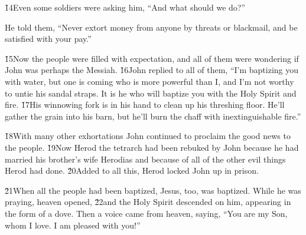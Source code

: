 \v{14}Even some soldiers were asking him, ``And what should we do?''

He told them, ``Never extort money from anyone by threats or blackmail, and be satisfied with your pay.''

\v{15}Now the people were filled with expectation, and all of them were wondering if John was perhaps the Messiah. \v{16}John replied to all of them, ``I'm baptizing you with water, but one is coming who is more powerful than I, and I'm not worthy to untie his sandal straps. It is he who will baptize you with the Holy Spirit and fire. \v{17}His winnowing fork is in his hand to clean up his threshing floor. He'll gather the grain into his barn, but he'll burn the chaff with inextinguishable fire.''

\v{18}With many other exhortations John continued to proclaim the good news to the people. \v{19}Now Herod the tetrarch had been rebuked by John because he had married his brother's wife Herodias and because of all of the other evil things Herod had done. \v{20}Added to all this, Herod locked John up in prison.

\v{21}When all the people had been baptized, Jesus, too, was baptized. While he was praying, heaven opened, \v{22}and the Holy Spirit descended on him, appearing in the form of a dove. Then a voice came from heaven, saying, ``You are my Son, whom I love. I am pleased with you!''

